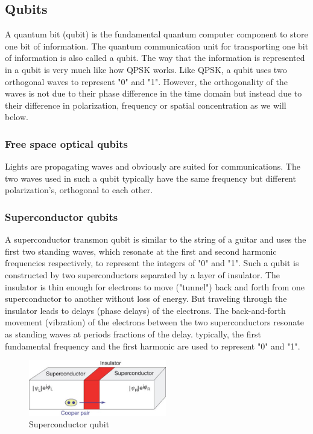 \documentclass{book}
\begin{document}
\subsection{Qubits}
A quantum bit (qubit) is the fundamental quantum computer component to store one bit of information. The quantum communication unit for transporting one bit of information is also called a qubit. The way that the information is represented in a qubit is very much like how QPSK works. Like QPSK, a qubit uses two orthogonal waves to represent "0" and "1". However, the orthogonality of the waves is not due to their phase difference in the time domain but instead due to their difference in polarization, frequency or spatial concentration as we will below.

\subsubsection{Free space optical qubits}
Lights are propagating waves and obviously are suited for communications. The two waves used in such a qubit typically have the same frequency but different polarization's, orthogonal to each other.

\subsubsection{Superconductor qubits}
A superconductor transmon qubit is similar to the string of a guitar and uses the first two standing waves, which resonate at the first and second harmonic frequencies respectively, to represent the integers of "0" and "1". Such a qubit is constructed by two superconductors separated by a layer of insulator. The insulator is thin enough for electrons to move ("tunnel") back and forth from one superconductor to another without loss of energy. But traveling through the insulator leads to delays (phase delays) of the electrons. The back-and-forth movement (vibration) of the electrons between the two superconductors resonate as standing waves at periods fractions of the delay. typically, the first fundamental frequency and the first harmonic are used to represent "0" and "1".
\begin{figure}[ht]
\includegraphics[width=6cm]{pic/supercQubit.jpg}
\caption{Superconductor qubit}
\label{Superconductor}
\end{figure}
\end{document}
